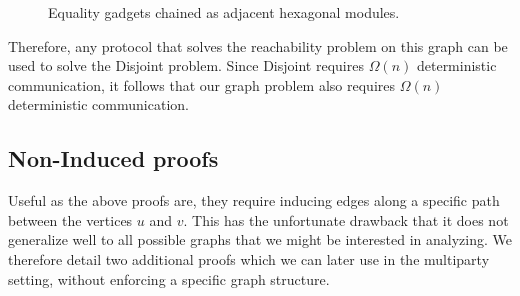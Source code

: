 \begin{figure}[h]
\centering
{}


\caption{Equality gadgets chained as adjacent hexagonal modules.}
\end{figure}

Therefore, any protocol that solves the reachability problem on this graph can be used to solve the Disjoint problem. Since Disjoint requires $\Omega(n)$ deterministic communication, it follows that our graph problem also requires $\Omega(n)$ deterministic communication.

\subsection*{Non-Induced proofs}
Useful as the above proofs are, they require inducing edges along a specific
path between the vertices $u$ and $v$. This has the unfortunate drawback that
it does not generalize well to all possible graphs that we might be interested
in analyzing. We therefore detail two additional proofs which we can later use
in the multiparty setting, without enforcing a specific graph structure.

